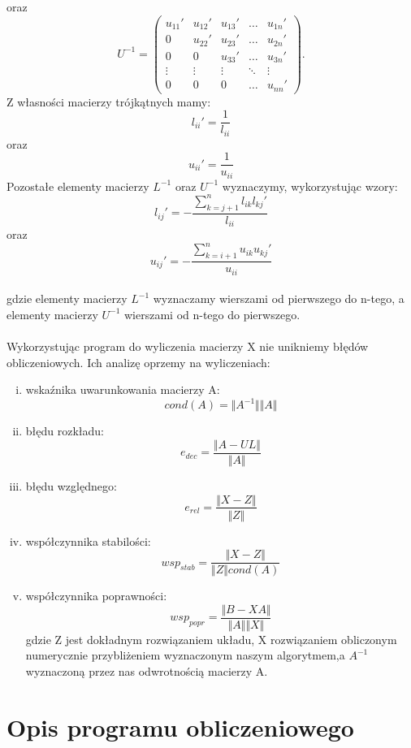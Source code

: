 \documentclass[12pt]{article}
\begin{document}
oraz
\[
U^{-1}=\begin{pmatrix}
u_{11}' & u_{12}' & u_{13}' & \ldots & u_{1n}' \\
0 & u_{22}' & u_{23}' & \ldots & u_{2n}' \\
0 & 0 & u_{33}' & \ldots & u_{3n}' \\
\vdots & \vdots & \vdots & \ddots & \vdots \\
0 & 0 & 0 & \ldots & u_{nn}'
\end{pmatrix}.
\]
Z w\l{}asno\'sci macierzy tr\'ojk\k{a}tnych mamy:
\[
l_{ii}'=\frac{1}{l_{ii}}
\]
oraz
\[
u_{ii}'=\frac{1}{u_{ii}}
\]
Pozosta\l{}e elementy macierzy $L^{-1}$ oraz $U^{-1}$ wyznaczymy, wykorzystuj\k{a}c wzory:
\[
l_{ij}'=-\frac{\sum_{k=j+1}^n l_{ik}l_{kj}'}{l_{ii}}
\]
oraz
\[
u_{ij}'=-\frac{\sum_{k=i+1}^n u_{ik}u_{kj}'}{u_{ii}}
\]
\\
gdzie elementy macierzy $L^{-1}$ wyznaczamy wierszami od pierwszego do n-tego, a elementy macierzy $U^{-1}$ wierszami od n-tego do pierwszego. 
\\
\\
Wykorzystuj\k{a}c program do wyliczenia macierzy X nie unikniemy b\l{}\k{e}d\'ow obliczeniowych. Ich analiz\k{e} oprzemy na wyliczeniach:
\begin{enumerate}[i)]
\item wska\'znika uwarunkowania macierzy A:
\[
cond(A)=\Vert A^{-1}\Vert  \Vert A \Vert
\]
\item b\l{}\k{e}du rozk\l{}adu:
\[
e_{dec}=\frac{\Vert A-UL \Vert}{\Vert A \Vert}
\]
\item b\l{}\k{e}du wzgl\k{e}dnego:
\[
e_{rel}=\frac{\Vert X-Z \Vert}{\Vert Z \Vert}
\]
\item wsp\'o\l{}czynnika stabilo\'sci:
\[
wsp_{stab}=\frac{\Vert X-Z \Vert}{\Vert Z \Vert cond(A)}
\]
\item wsp\'o\l{}czynnika poprawno\'sci:
\[
wsp_{popr}=\frac{\Vert B-XA \Vert}{\Vert A \Vert \Vert X \Vert}
\]
gdzie Z jest dok\l{}adnym rozwi\k{a}zaniem uk\l{}adu, X rozwi\k{a}zaniem obliczonym numerycznie przybli\.zeniem wyznaczonym naszym algorytmem,a $A^{-1}$ wyznaczon\k{a} przez nas odwrotno\'sci\k{a} macierzy A. 


\end{enumerate}

\vskip20pt

\section{Opis programu obliczeniowego}
\end{document}
